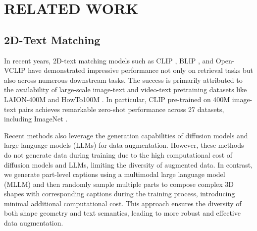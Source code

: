 \section{RELATED WORK}
\subsection{2D-Text Matching}
In recent years, 2D-text matching models such as CLIP \cite{radford2021learning}, BLIP \cite{li2022blip}, and Open-VCLIP \cite{weng2023open} have demonstrated impressive performance not only on retrieval tasks but also across numerous downstream tasks. The success is primarily attributed to the availability of large-scale image-text and video-text pretraining datasets like LAION-400M \cite{schuhmann2021laion} and HowTo100M \cite{miech2019howto100m}.
In particular, CLIP \cite{radford2021learning} pre-trained on 400M image-text pairs achieves remarkable zero-shot performance across 27 datasets, including ImageNet \cite{deng2009imagenet}. 

Recent methods \cite{Peng_2024_CVPR, doveh2023teaching} also leverage the generation capabilities of diffusion models \cite{podellsdxl} and large language models (LLMs) \cite{le2022bloom} for data augmentation. However, these methods do not generate data during training due to the high computational cost of diffusion models and LLMs, limiting the diversity of augmented data.
In contrast, we generate part-level captions using a multimodal large language model (MLLM) and then randomly sample multiple parts to compose complex 3D shapes with corresponding captions during the training process, introducing minimal additional computational cost. This approach ensures the diversity of both shape geometry and text semantics, leading to more robust and effective data augmentation.



